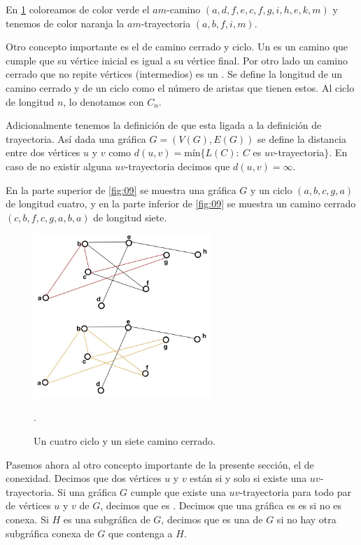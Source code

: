 En \cref{fig:08} coloreamos de color verde el $am$-camino $(a,d,f,e,c,f,g,i,h,e,k,m)$ y tenemos de color naranja la $am$-trayectoria $(a,b,f,i,m)$.

Otro concepto importante es el de camino cerrado y ciclo. Un  es un camino que cumple que su vértice inicial es igual a su vértice final. Por otro lado un camino cerrado que no repite vértices (intermedios) es un . Se define la longitud de un camino cerrado y de un ciclo como el número de aristas que tienen estos. Al ciclo de longitud $n$, lo denotamos con $C_n$.

Adicionalmente tenemos la definición de  que esta ligada a la definición de trayectoria. Así dada una gráfica $G=(V(G),E(G))$ se define la distancia entre dos vértices $u$ y $v$ como $d(u,v)=$m\'in$ \{L(C) \colon\ C$ es $uv$-trayectoria$ \}$. En caso de no existir alguna $uv$-trayectoria decimos que $d(u,v)=\infty$. 

En la parte superior de \cref{fig:09} se muestra una gráfica $G$ y un ciclo $(a,b,c,g,a)$ de longitud cuatro, y en la parte inferior de \cref{fig:09} se muestra un camino cerrado $(c,b,f,c,g,a,b,a)$ de longitud siete.

\begin{figure}[H]
  \centering
  \includegraphics[width=0.6\textwidth]{recursos/capturas/13.jpg}
  \caption{Un cuatro ciclo y un siete camino cerrado.}.
  \label{fig:08}
\end{figure}

Pasemos ahora al otro concepto importante de la presente sección, el de conexidad. Decimos que dos vértices  $u$ y $v$ están  si y solo si existe una $uv$-trayectoria. Si una gráfica $G$ cumple que existe una $uv$-trayectoria para todo par de vértices $u$ y $v$ de $G$, decimos que es . Decimos que una gr\'afica es es  si no es conexa.
Si $H$ es una subgráfica de $G$, decimos que es una  de $G$ si no hay otra subgráfica conexa de $G$ que contenga a $H$.

